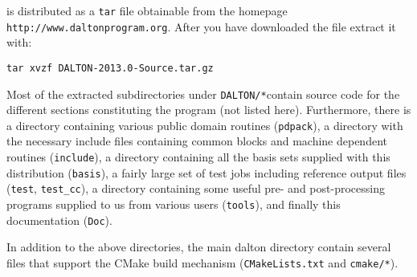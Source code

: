 {\dalton} is distributed as a \verb|tar| file obtainable from
the {\dalton} homepage  \verb|http://www.daltonprogram.org|.
After you have downloaded the file extract it with:
\begin{verbatim}
tar xvzf DALTON-2013.0-Source.tar.gz
\end{verbatim}
Most of the extracted subdirectories under \verb|DALTON/*|contain source code for the different
sections constituting the program (not listed here).  Furthermore, there is a
directory containing various public domain routines (\verb|pdpack|), a
directory with the necessary include files containing common blocks and machine
dependent routines (\verb|include|), a directory containing all the basis sets
supplied with this distribution (\verb|basis|), a fairly large set of test jobs
including reference output files (\verb|test|, \verb|test_cc|), a directory
containing some useful pre- and post-processing programs supplied to us from
various users (\verb|tools|), and finally this documentation (\verb|Doc|). 

In addition to the above directories, the main dalton directory contain several
files that support the CMake build mechanism (\verb|CMakeLists.txt| and \verb|cmake/*|).
